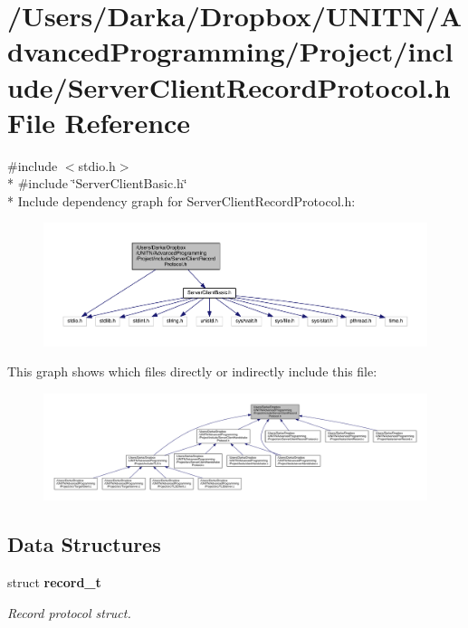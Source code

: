 \section{/\+Users/\+Darka/\+Dropbox/\+U\+N\+I\+T\+N/\+Advanced\+Programming/\+Project/include/\+Server\+Client\+Record\+Protocol.h File Reference}
\label{_server_client_record_protocol_8h}
{\ttfamily \#include $<$stdio.\+h$>$}\\*
{\ttfamily \#include \char`\"{}Server\+Client\+Basic.\+h\char`\"{}}\\*
Include dependency graph for Server\+Client\+Record\+Protocol.\+h\+:\nopagebreak
\begin{figure}[H]
\begin{center}
\leavevmode
\includegraphics[width=350pt]{_server_client_record_protocol_8h__incl}
\end{center}
\end{figure}
This graph shows which files directly or indirectly include this file\+:\nopagebreak
\begin{figure}[H]
\begin{center}
\leavevmode
\includegraphics[width=350pt]{_server_client_record_protocol_8h__dep__incl}
\end{center}
\end{figure}
\subsection*{Data Structures}
\begin{DoxyCompactItemize}
\item 
struct {\bf record\+\_\+t}
\begin{DoxyCompactList}\small\item\em Record protocol struct. \end{DoxyCompactList}\end{DoxyCompactItemize}
